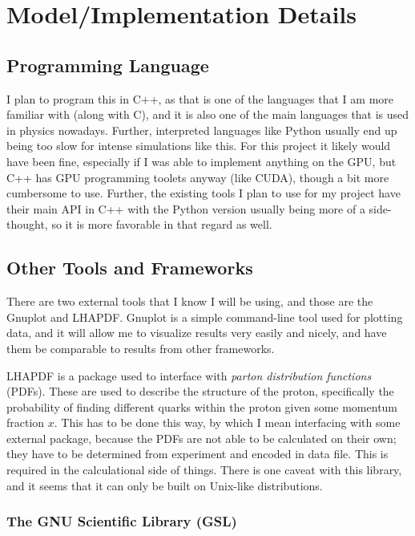 \section{Model/Implementation Details}\label{sec:Model-Implem-Details}



\subsection{Programming Language}
I plan to program this in C++, as that is one of the languages that I am more familiar with (along with C), and it is also one of the main languages that is used in physics nowadays. Further, interpreted languages like Python usually end up being too slow for intense simulations like this. For this project it likely would have been fine, especially if I was able to implement anything on the GPU, but C++ has GPU programming toolets anyway (like CUDA), though a bit more cumbersome to use. Further, the existing tools I plan to use for my project have their main API in C++ with the Python version usually being more of a side-thought, so it is more favorable in that regard as well.



\subsection{Other Tools and Frameworks}

There are two external tools that I know I will be using, and those are the Gnuplot and LHAPDF. Gnuplot is a simple command-line tool used for plotting data, and it will allow me to visualize results very easily and nicely, and have them be comparable to results from other frameworks.

\textsc{LHAPDF} is a package used to interface with \textit{parton distribution functions} (PDFs). These are used to describe the structure of the proton, specifically the probability of finding different quarks within the proton given some momentum fraction $x$. This has to be done this way, by which I mean interfacing with some external package, because the PDFs are not able to be calculated on their own; they have to be determined from experiment and encoded in data file. This is required in the calculational side of things. There is one caveat with this library, and it seems that it can only be built on Unix-like distributions.

\subsubsection{The GNU Scientific Library (GSL)}

